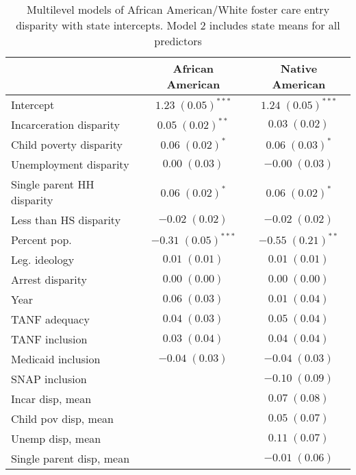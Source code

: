 
\begin{table}
\caption{Multilevel models of African American/White foster care entry disparity with state intercepts. Model 2 includes state means for all predictors }
\begin{center}
\begin{tabular}{l c c }
\hline
 & African American & Native American \\
\hline
Intercept                  & $1.23 \; (0.05)^{***}$  & $1.24 \; (0.05)^{***}$ \\
Incarceration disparity    & $0.05 \; (0.02)^{**}$   & $0.03 \; (0.02)$       \\
Child poverty disparity    & $0.06 \; (0.02)^{*}$    & $0.06 \; (0.03)^{*}$   \\
Unemployment disparity     & $0.00 \; (0.03)$        & $-0.00 \; (0.03)$      \\
Single parent HH disparity & $0.06 \; (0.02)^{*}$    & $0.06 \; (0.02)^{*}$   \\
Less than HS disparity     & $-0.02 \; (0.02)$       & $-0.02 \; (0.02)$      \\
Percent pop.               & $-0.31 \; (0.05)^{***}$ & $-0.55 \; (0.21)^{**}$ \\
Leg. ideology              & $0.01 \; (0.01)$        & $0.01 \; (0.01)$       \\
Arrest disparity           & $0.00 \; (0.00)$        & $0.00 \; (0.00)$       \\
Year                       & $0.06 \; (0.03)$        & $0.01 \; (0.04)$       \\
TANF adequacy              & $0.04 \; (0.03)$        & $0.05 \; (0.04)$       \\
TANF inclusion             & $0.03 \; (0.04)$        & $0.04 \; (0.04)$       \\
Medicaid inclusion         & $-0.04 \; (0.03)$       & $-0.04 \; (0.03)$      \\
SNAP inclusion             &                         & $-0.10 \; (0.09)$      \\
Incar disp, mean           &                         & $0.07 \; (0.08)$       \\
Child pov disp, mean       &                         & $0.05 \; (0.07)$       \\
Unemp disp, mean           &                         & $0.11 \; (0.07)$       \\
Single parent disp, mean   &                         & $-0.01 \; (0.06)$      \\

\end{tabular}
\end{center}
\end{table}
